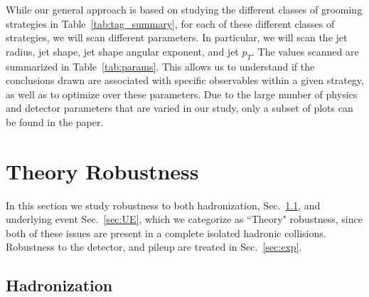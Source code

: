 \documentclass[11pt,letterpaper]{article}
\DeclareRobustCommand{\Sec}[1]{Sec.~\ref{#1}}
\DeclareRobustCommand{\Tab}[1]{Table~\ref{#1}}
\begin{document}
While our general approach is based on studying the different classes of grooming strategies in \Tab{tab:tag_summary}, for each of these different classes of strategies, we will scan different parameters.
%
In particular, we will scan the jet radius, jet shape, jet shape angular exponent, and jet $p_T$.
%
The values scanned are summarized in \Tab{tab:params}.
%
This allows us to understand if the conclusions drawn are associated with specific observables within a given strategy, as well as to optimize over these parameters.
%
Due to the large number of physics and detector parameters that are varied in our study, only a subset of plots can be found in the paper.
%


























\section{Theory Robustness}\label{sec:np}


In this section we study robustness to both hadronization, \Sec{sec:hadr}, and underlying event \Sec{sec:UE}, which we categorize as ``Theory" robustness, since both of these issues are present in a complete isolated hadronic collisions. Robustness to the detector, and pileup are treated in \Sec{sec:exp}. 








\subsection{Hadronization}\label{sec:hadr}
\end{document}
